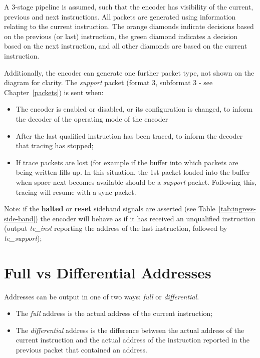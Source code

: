 A 3-stage pipeline is assumed, such that the encoder has 
visibility of the current, previous and next instructions.  All packets are generated using 
information relating to the current instruction.  The orange diamonds indicate decisions 
based on the previous (or last) instruction, the green diamond indicates a decision based on the
next instruction, and all other diamonds are based on the current instruction.

Additionally, the encoder can generate one further packet type, not shown on the diagram for 
clarity.  The \textit{support} packet (format 3, subformat 3 - see Chapter~\ref{packets}) is 
sent when:

\begin{itemize}
  \item The encoder is enabled or disabled, or its configuration is changed, 
    to inform the decoder of the operating mode of the encoder
  \item After the last qualified instruction has been traced, to inform the decoder that 
    tracing has stopped;
  \item If trace packets are lost (for example if the buffer into which packets are being 
    written fills up.  In this situation, the 1st packet 
    loaded into the buffer when space next becomes available should be a \textit{support} 
    packet.  Following this, tracing will resume with a sync packet.
\end{itemize}

Note: if the \textbf{halted} or \textbf{reset} sideband signals are asserted (see Table~\ref{tab:ingress-side-band})
the encoder will behave as if it has received an unqualified instruction (output \textit{te\_inst}
reporting the address of the last instruction, followed by \textit{te\_support});


\section{Full vs Differential Addresses} \label{addresses}
Addresses can be output in one of two ways: \textit{full} or \textit{differential}.

\begin{itemize}
  \item The \textit{full} address is the actual address of the current instruction;
  \item The \textit{differential} address is the difference between the actual address of 
    the current instruction and the actual address of the instruction reported in the 
    previous packet that contained an address.
\end{itemize}

